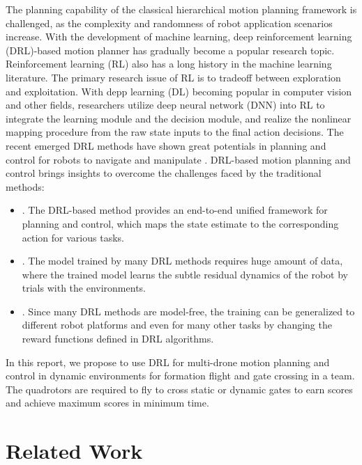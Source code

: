 \documentclass[letterpaper,journal,twoside]{IEEEtran}
\begin{document}
The planning capability of the 
classical hierarchical motion planning framework is 
challenged, 
as the complexity and randomness of robot application 
scenarios increase. With 
the development of machine learning, deep reinforcement 
learning (DRL)-based motion planner has gradually become a 
popular research topic.
Reinforcement learning (RL) also has a long history in the 
machine learning literature. 
The primary research issue of RL is to tradeoff between 
exploration and exploitation. 
With depp learning (DL) becoming popular in computer vision
and other fields, researchers utilize deep neural network 
(DNN) into RL to integrate the learning module and the 
decision module, and realize the nonlinear mapping 
procedure from the raw state inputs to the final action 
decisions\cite{dong2023review}.
The recent emerged DRL methods have shown great potentials 
in planning and control for robots to navigate and 
manipulate
\cite{lee2020learning,hwangbo2017control,gu2017deep}.
DRL-based motion planning and control brings insights to 
overcome the challenges faced by the traditional methods: 
\begin{itemize}
  \item {}. The DRL-based method 
  provides an end-to-end unified framework for planning 
  and control, which maps the  state estimate to the 
  corresponding action for various tasks.
  \item {}. The model trained by many
  DRL methods requires huge amount of data, where the 
  trained model learns the subtle residual dynamics of 
  the robot by trials with the environments.
  \item {}. Since many DRL methods are 
  model-free, the training can be generalized to different 
  robot platforms and even for many other tasks by changing 
  the reward functions defined in DRL algorithms.
\end{itemize}

In this report, we propose to use DRL for multi-drone 
motion planning and control in dynamic environments for 
formation flight and gate crossing in a team.
The quadrotors are required to fly to cross static 
or dynamic gates to earn scores and achieve maximum scores
in minimum time. 


\section{Related Work}
\end{document}
